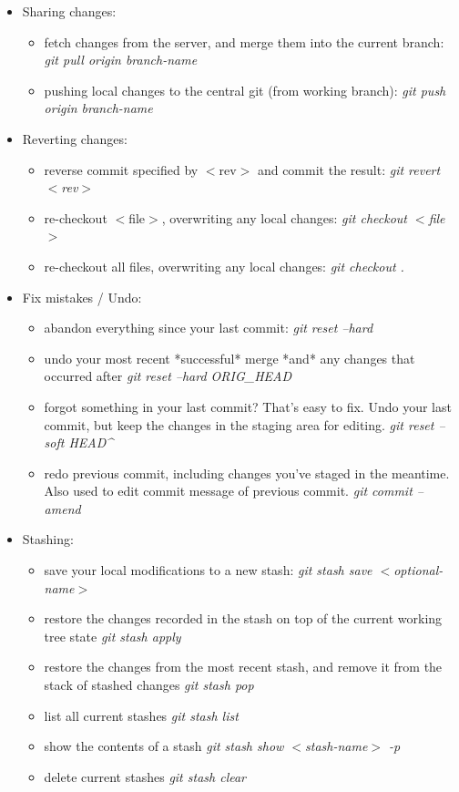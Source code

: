 \begin{itemize}
\item Sharing changes:
   \begin{itemize}
	  \item fetch changes from the server, and merge them into the current branch: \textit{ git pull origin branch-name }
	  \item pushing local changes to the central git (from working branch): \textit{ git push origin branch-name }
   \end{itemize}      
\item Reverting changes:
   \begin{itemize}
	  \item reverse commit specified by $<$rev$>$ and commit the result: \textit{ git revert $<$rev$>$ }
	  \item re-checkout $<$file$>$, overwriting any local changes: \textit{git checkout $<$file$>$ }
	  \item re-checkout all files, overwriting any local changes: \textit{git checkout . }
   \end{itemize}      
\item Fix mistakes / Undo:
   \begin{itemize}
	  \item abandon everything since your last commit: \textit{ git reset --hard }
	  \item undo your most recent *successful* merge *and* any changes that occurred
	    after \textit{ git reset --hard ORIG\_HEAD }
	  \item forgot something in your last commit? That's easy to fix. Undo your last
	    commit, but keep the changes in the staging area for editing.
	    \textit{ git reset --soft HEAD\^ }
	  \item redo previous commit, including changes you've staged in the meantime.
	    Also used to edit commit message of previous commit. \textit{git commit --amend}
   \end{itemize}      
\item Stashing:
   \begin{itemize}
	  \item save your local modifications to a new stash: \textit{ git stash save $<$optional-name$>$ }
	  \item restore the changes recorded in the stash on top of the current working tree
	    state \textit{git stash apply}
          \item restore the changes from the most recent stash, and remove it from the stack
	    of stashed changes \textit{git stash pop}
          \item list all current stashes \textit{ git stash list }
	  \item show the contents of a stash \textit{ git stash show $<$stash-name$>$ -p}
	  \item delete current stashes \textit{git stash clear}
   \end{itemize}      


\end{itemize}
